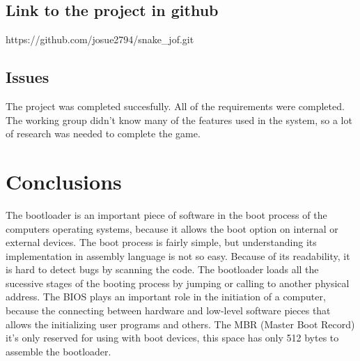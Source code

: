 \documentclass[11pt]{book}
\begin{document}
\subsection*{Link to the project in github}
https://github.com/josue2794/snake\_jof.git

\subsection*{Issues}

The project was completed succesfully. All of the requirements were completed. The working group didn't know many of the features used in the system, so a lot of research was needed to complete the game.


\newpage
\section*{Conclusions}

The bootloader is an important piece of software in the boot process of the computers operating systems, because it allows the boot option on internal or external devices. The boot process is fairly simple, but understanding its implementation in assembly language is not so easy. Because of its readability, it is hard to detect bugs by scanning the code. The bootloader loads all the sucessive stages of the booting process by jumping or calling to another physical address.
The BIOS plays an important role in the initiation of a computer, because the connecting between hardware and low-level software pieces that allows the initializing user programs and others.
The MBR (Master Boot Record) it's only reserved for using with boot devices, this space has only 512 bytes to assemble the bootloader.


\newpage
\end{document}
